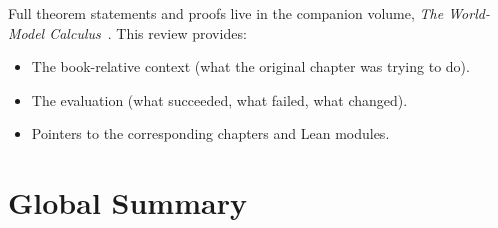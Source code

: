 \documentclass[11pt,openany]{report}
\begin{document}
Full theorem statements and proofs live in the companion volume,
\emph{The World-Model Calculus}~\cite{xiPLN2026}.
This review provides:
\begin{itemize}
\item The book-relative context (what the original chapter was trying to do).
\item The evaluation (what succeeded, what failed, what changed).
\item Pointers to the corresponding \xiPLN{} chapters and Lean modules.
\end{itemize}


\chapter{Global Summary}
\label{ch:summary}
\end{document}
